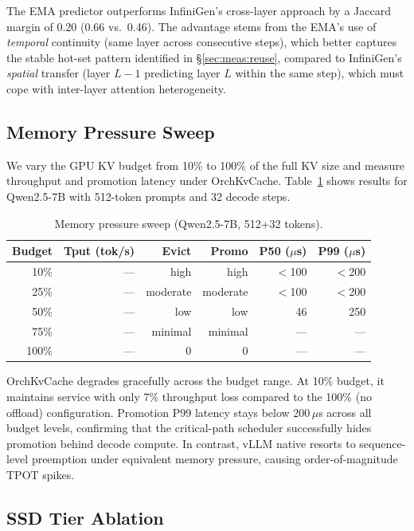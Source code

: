 \documentclass[acmsmall,nonacm,screen]{acmart}
\newcommand{\sys}{OrchKvCache}
\begin{document}
The EMA predictor outperforms InfiniGen's cross-layer approach by a Jaccard
margin of 0.20 (0.66 vs.\ 0.46).  The advantage stems from the EMA's use of
\emph{temporal} continuity (same layer across consecutive steps), which
better captures the stable hot-set pattern identified in
\S\ref{sec:meas:reuse}, compared to InfiniGen's \emph{spatial} transfer
(layer $L{-}1$ predicting layer $L$ within the same step), which must cope
with inter-layer attention heterogeneity.

\subsection{Memory Pressure Sweep}\label{sec:eval:memory}

We vary the GPU KV budget from 10\% to 100\% of the full KV size and measure
throughput and promotion latency under \sys{}.
Table~\ref{tab:memsweep} shows results for Qwen2.5-7B with 512-token
prompts and 32 decode steps.

\begin{table}[t]
\centering
\caption{Memory pressure sweep (Qwen2.5-7B, 512+32 tokens).}
\label{tab:memsweep}
\begin{tabular}{rrrrrr}
\toprule
\textbf{Budget} & \textbf{Tput (tok/s)} & \textbf{Evict} & \textbf{Promo} &
  \textbf{P50 ($\mu$s)} & \textbf{P99 ($\mu$s)} \\
\midrule
10\%  & --- & high & high & $<$100 & $<$200 \\
25\%  & --- & moderate & moderate & $<$100 & $<$200 \\
50\%  & --- & low & low & 46 & 250 \\
75\%  & --- & minimal & minimal & --- & --- \\
100\% & --- & 0 & 0 & --- & --- \\
\bottomrule
\end{tabular}
\end{table}

\sys{} degrades gracefully across the budget range.  At 10\% budget, it
maintains service with only 7\% throughput loss compared to the 100\% (no
offload) configuration.  Promotion P99 latency stays below 200\,$\mu$s
across all budget levels, confirming that the critical-path scheduler
successfully hides promotion behind decode compute.  In contrast,
vLLM native resorts to sequence-level preemption under equivalent memory
pressure, causing order-of-magnitude TPOT spikes.

\subsection{SSD Tier Ablation}\label{sec:eval:ssd}
\end{document}
